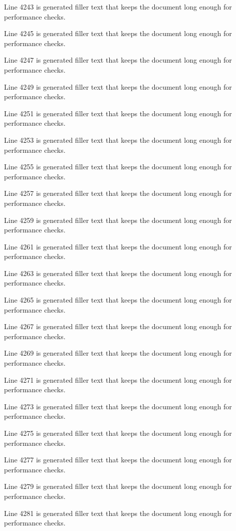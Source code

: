Line 4243 is generated filler text that keeps the document long enough for performance checks.

Line 4245 is generated filler text that keeps the document long enough for performance checks.

Line 4247 is generated filler text that keeps the document long enough for performance checks.

Line 4249 is generated filler text that keeps the document long enough for performance checks.

Line 4251 is generated filler text that keeps the document long enough for performance checks.

Line 4253 is generated filler text that keeps the document long enough for performance checks.

Line 4255 is generated filler text that keeps the document long enough for performance checks.

Line 4257 is generated filler text that keeps the document long enough for performance checks.

Line 4259 is generated filler text that keeps the document long enough for performance checks.

Line 4261 is generated filler text that keeps the document long enough for performance checks.

Line 4263 is generated filler text that keeps the document long enough for performance checks.

Line 4265 is generated filler text that keeps the document long enough for performance checks.

Line 4267 is generated filler text that keeps the document long enough for performance checks.

Line 4269 is generated filler text that keeps the document long enough for performance checks.

Line 4271 is generated filler text that keeps the document long enough for performance checks.

Line 4273 is generated filler text that keeps the document long enough for performance checks.

Line 4275 is generated filler text that keeps the document long enough for performance checks.

Line 4277 is generated filler text that keeps the document long enough for performance checks.

Line 4279 is generated filler text that keeps the document long enough for performance checks.

Line 4281 is generated filler text that keeps the document long enough for performance checks.

